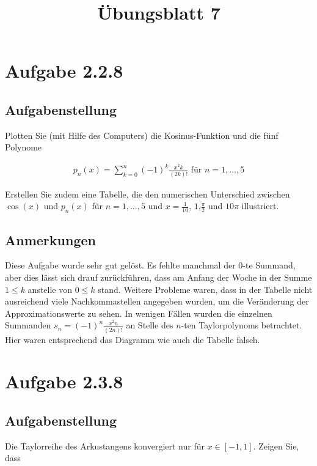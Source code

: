 \documentclass[a4paper]{article}
\title{Übungsblatt 7}
\date{}
\author{}
\begin{document}
\maketitle

\section{Aufgabe 2.2.8}

\subsection{Aufgabenstellung}

Plotten Sie (mit Hilfe des Computers) die Kosinus-Funktion und die fünf Polynome

\begin{align*}
  p_n(x) = \sum_{k=0}^n (-1)^k \frac{x^2k}{(2k)!} \text{ für } n=1,\ldots,5
\end{align*}

Erstellen Sie zudem eine Tabelle, die den numerischen Unterschied zwischen $\cos(x)$ und $p_n(x)$ für $n=1,\ldots,5$ und $x=\frac{1}{10}$, $1$,$\frac{\pi}{2}$ und $10\pi$ illustriert.

\subsection{Anmerkungen}

Diese Aufgabe wurde sehr gut gelöst. Es fehlte manchmal der 0-te Summand, aber dies lässt sich drauf zurückführen, dass am Anfang der Woche in der Summe $1\le k$ anstelle von $0\le k$ stand. Weitere Probleme waren, dass in der Tabelle nicht ausreichend viele Nachkommastellen angegeben wurden, um die Veränderung der Approximationswerte zu sehen. In wenigen Fällen wurden die einzelnen Summanden $s_n = (-1)^n \frac{x^2n}{(2n)!}$ an Stelle des $n$-ten Taylorpolynoms betrachtet. Hier waren entsprechend das Diagramm wie auch die Tabelle falsch.

\section{Aufgabe 2.3.8}

\subsection{Aufgabenstellung}

Die Taylorreihe des Arkustangens konvergiert nur für $x\in[-1,1]$. Zeigen Sie, dass 
\end{document}
